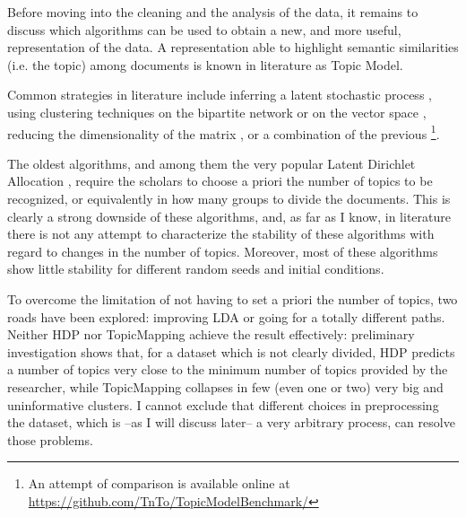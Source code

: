 \documentclass[a4paper, 11pt, headings=standardclasses, tablecaptionsbelow]{scrartcl}
\begin{document}
Before moving into the cleaning and the analysis of the data, it remains to discuss which algorithms can be used to obtain a new, and more useful, representation of the data. A representation able to highlight semantic similarities (i.e. the topic) among documents is known in literature as Topic Model.

Common strategies in literature include inferring a latent stochastic process \parencite{blei2003,teh2005,griffiths2004,hofmann1999}, using clustering techniques on the bipartite network \parencite{gerlach2018} or on the vector space \parencite{angelov2020,grootendorst2022}, reducing the dimensionality of the matrix \parencite{kim2008}, or a combination of the previous \parencite{lancichinetti2015}\footnote{An attempt of comparison is available online at \url{https://github.com/TnTo/TopicModelBenchmark/}}.

The oldest algorithms, and among them the very popular Latent Dirichlet Allocation \parencite[LDA][]{blei2003}, require the scholars to choose a priori the number of topics to be recognized, or equivalently in how many groups to divide the documents. This is clearly a strong downside of these algorithms, and, as far as I know, in literature there is not any attempt to characterize the stability of these algorithms with regard to changes in the number of topics. Moreover, most of these algorithms show little stability for different random seeds and initial conditions.

To overcome the limitation of not having to set a priori the number of topics, two roads have been explored: improving LDA \parencite{teh2005,lancichinetti2015} or going for a totally different paths.
Neither HDP \parencite{teh2005} nor TopicMapping \parencite{lancichinetti2015} achieve the result effectively: preliminary investigation shows that, for a dataset which is not clearly divided, HDP predicts a number of topics very close to the minimum number of topics provided by the researcher, while TopicMapping collapses in few (even one or two) very big and uninformative clusters. I cannot exclude that different choices in preprocessing the dataset, which is --as I will discuss later-- a very arbitrary process, can resolve those problems.
\end{document}
